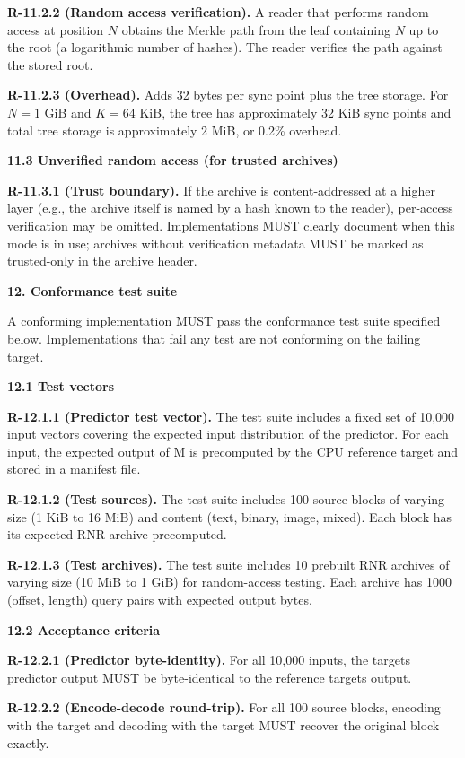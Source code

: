 \documentclass[
]{article}
\begin{document}
\textbf{R-11.2.2 (Random access verification).} A reader that
performs random access at position $N$ obtains the Merkle path from
the leaf containing $N$ up to the root (a logarithmic number of
hashes). The reader verifies the path against the stored root.

\textbf{R-11.2.3 (Overhead).} Adds 32 bytes per sync point plus the
tree storage. For $N = 1$ GiB and $K = 64$ KiB, the tree has
approximately 32 KiB sync points and total tree storage is
approximately 2 MiB, or 0.2\% overhead.

\textbf{11.3 Unverified random access (for trusted archives)}

\textbf{R-11.3.1 (Trust boundary).} If the archive is content-addressed
at a higher layer (e.g., the archive itself is named by a hash known to
the reader), per-access verification may be omitted. Implementations
MUST clearly document when this mode is in use; archives without
verification metadata MUST be marked as
\textquotesingle trusted-only\textquotesingle{} in the archive header.

\textbf{12. Conformance test suite}

A conforming implementation MUST pass the conformance test suite
specified below. Implementations that fail any test are not conforming
on the failing target.

\textbf{12.1 Test vectors}

\textbf{R-12.1.1 (Predictor test vector).} The test suite includes a
fixed set of 10,000 input vectors covering the expected input
distribution of the predictor. For each input, the expected output of M
is precomputed by the CPU reference target and stored in a manifest
file.

\textbf{R-12.1.2 (Test sources).} The test suite includes 100 source
blocks of varying size (1 KiB to 16 MiB) and content (text, binary,
image, mixed). Each block has its expected RNR archive precomputed.

\textbf{R-12.1.3 (Test archives).} The test suite includes 10 prebuilt
RNR archives of varying size (10 MiB to 1 GiB) for random-access
testing. Each archive has 1000 (offset, length) query pairs with
expected output bytes.

\textbf{12.2 Acceptance criteria}

\textbf{R-12.2.1 (Predictor byte-identity).} For all 10,000 inputs, the
target\textquotesingle s predictor output MUST be byte-identical to the
reference target\textquotesingle s output.

\textbf{R-12.2.2 (Encode-decode round-trip).} For all 100 source blocks,
encoding with the target and decoding with the target MUST recover the
original block exactly.
\end{document}

